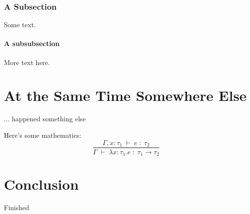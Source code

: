 \documentclass{ituthesis}
\begin{document}
\subsection{A Subsection}
Some text.
\subsubsection{A subsubsection}
More text here.

\chapter{At the Same Time Somewhere Else}
... happened something else

Here's some mathematics:
\begin{displaymath}
  \frac{
    \Gamma, x:\tau_1\;\vdash\; e \;:\; \tau_2
  }{
    \Gamma\;\vdash\;\lambda x : \tau_1 . e \;:\; \tau_1\to\tau_2}
\end{displaymath}

\chapter{Conclusion}
Finished
\end{document}
